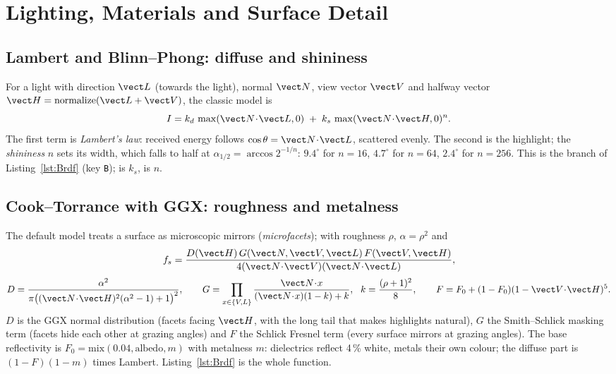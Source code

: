 \section{Lighting, Materials and Surface Detail}\label{sec:shading}
\subsection{Lambert and Blinn--Phong: diffuse and shininess}
For a light with direction $\vect L$ (towards the light), normal $\vect N$, view vector $\vect V$ and halfway vector $\vect H=\mathrm{normalize}(\vect L+\vect V)$, the classic model is
\begin{equation}
I=k_d\,\max(\vect N\!\cdot\!\vect L,0)\;+\;k_s\,\max(\vect N\!\cdot\!\vect H,0)^{n}.
\end{equation}
The first term is \emph{Lambert's law}: received energy follows $\cos\theta=\vect N\!\cdot\!\vect L$, scattered evenly. The second is the highlight; the \emph{shininess} $n$ sets its width, which falls to half at $\alpha_{1/2}=\arccos 2^{-1/n}$: $9.4^\circ$ for $n=16$, $4.7^\circ$ for $n=64$, $2.4^\circ$ for $n=256$. This is the  branch of Listing~\ref{lst:Brdf} (key \texttt{B});  is $k_s$,  is $n$.

\subsection{Cook--Torrance with GGX: roughness and metalness}
The default model treats a surface as microscopic mirrors (\emph{microfacets}); with roughness $\rho$, $\alpha=\rho^2$ and
\begin{equation}
f_s=\frac{D(\vect H)\,G(\vect N,\vect V,\vect L)\,F(\vect V,\vect H)}{4(\vect N\!\cdot\!\vect V)(\vect N\!\cdot\!\vect L)},
\end{equation}
\begin{equation}
D=\frac{\alpha^2}{\pi\bigl((\vect N\!\cdot\!\vect H)^2(\alpha^2-1)+1\bigr)^2},\qquad
G=\prod_{x\in\{V,L\}}\frac{\vect N\!\cdot\!x}{(\vect N\!\cdot\!x)(1-k)+k},\ \ k=\frac{(\rho+1)^2}{8},\qquad
F=F_0+(1-F_0)(1-\vect V\!\cdot\!\vect H)^5 .
\end{equation}
$D$ is the GGX normal distribution (facets facing $\vect H$, with the long tail that makes highlights natural), $G$ the Smith--Schlick masking term (facets hide each other at grazing angles) and $F$ the Schlick Fresnel term (every surface mirrors at grazing angles). The base reflectivity is $F_0=\mathrm{mix}(0.04,\text{albedo},m)$ with metalness $m$: dielectrics reflect 4\,\% white, metals their own colour; the diffuse part is $(1-F)(1-m)$ times Lambert. Listing~\ref{lst:Brdf} is the whole function.
\lstBrdf
